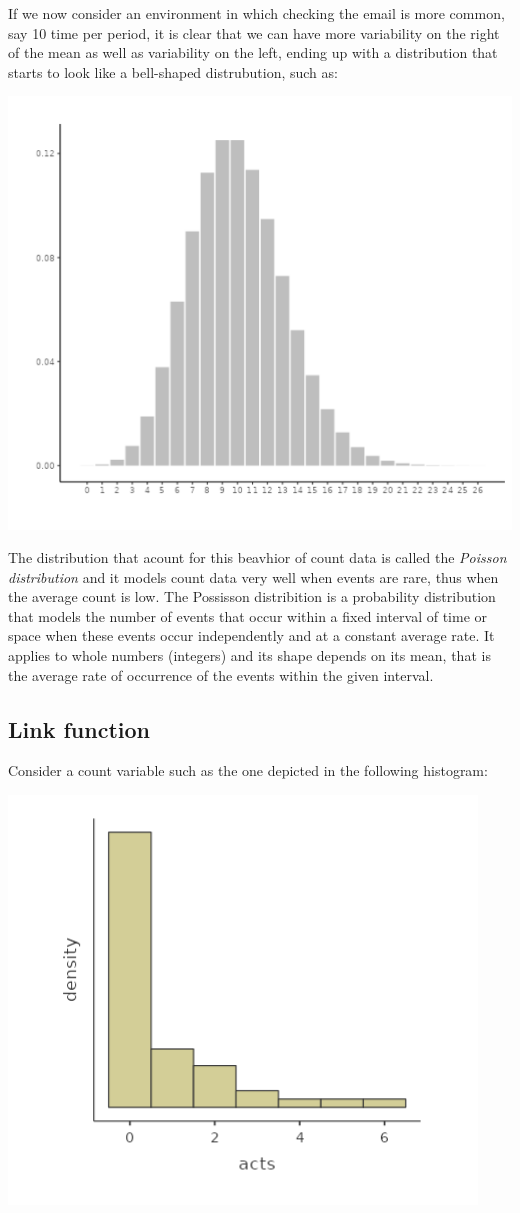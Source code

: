 \documentclass[
]{book}
\begin{document}
If we now consider an environment in which checking the email is more common, say 10 time per period, it is clear that we can have more variability on the right of the mean as well as variability on the left, ending up with a distribution that starts to look like a bell-shaped distrubution, such as:

\includegraphics[width=0.6\linewidth]{bookletpics/3_poisson_theory3}

The distribution that acount for this beavhior of count data is called the \emph{Poisson distribution} and it models count data very well when events are rare, thus when the average count is low. The Possisson distribition is a probability distribution that models the number of events that occur within a fixed interval of time or space when these events occur independently and at a constant average rate. It applies to whole numbers (integers) and its shape depends on its mean, that is the average rate of occurrence of the events within the given interval.

\hypertarget{link-function}{%
\subsection{Link function}\label{link-function}}

Consider a count variable such as the one depicted in the following histogram:

\includegraphics[width=0.6\linewidth]{bookletpics/3_poisson_theory4}
\end{document}
